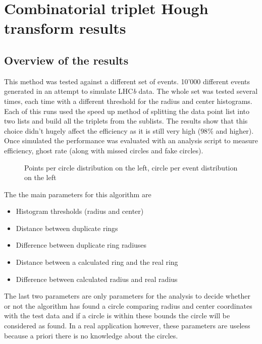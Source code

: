 \documentclass[11pt,twoside]{scrreprt}
\begin{document}


\section{Combinatorial triplet Hough transform results} %
\label{sec:combinatorial_approach_results}

\subsection{Overview of the results} %
\label{sub:overview_of_the_results}

This method was tested against a different set of events. 10'000 different events generated in an attempt to simulate LHC\textit{b} data. 
The whole set was tested several times, each time with a different threshold for the radius and center histograms. 
Each of this runs used the speed up method of splitting the data point list into two lists and build all the triplets from 
the sublists. The results show that this choice didn't hugely affect the efficiency as it is still very high ($98\%$ and higher). 
Once simulated the performance was evaluated with an analysis script to measure efficiency, ghost rate (along with missed 
circles and fake circles).

\begin{figure}[ht]
  \centering
  \caption{Points per circle distribution on the left, circle per event distribution on the left}
  \label{comb:ppc_cpe}
\end{figure}

The the main parameters for this algorithm are
\begin{itemize}
  \item Histogram thresholds (radius and center)
  \item Distance between duplicate rings
  \item Difference between duplicate ring radiuses
  \item Distance between a calculated ring and the real ring
  \item Difference between calculated radius and real radius
\end{itemize}
The last two parameters are only parameters for the analysis to decide whether or not the algorithm has found a circle comparing radius
and center coordinates with the test data and if a circle is within these bounds the circle will be considered as found. In a real application
however, these parameters are useless because a priori there is no knowledge about the circles.
\end{document}
